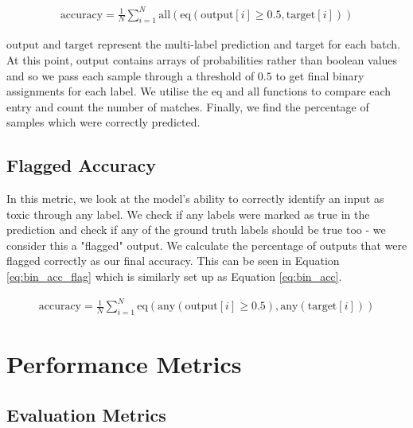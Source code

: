\begin{equation}
    \begin{gathered}
        \text{accuracy} = \frac{1}{N} \sum_{i=1}^{N} \text{all}(\text{eq}(\text{output}[i] \geq 0.5, \text{target}[i]))
    \end{gathered}
    \label{eq:bin_acc}
\end{equation}

$\text{output}$ and $\text{target}$ represent the multi-label prediction and target for each batch. At this point, $\text{output}$ contains arrays of probabilities rather than boolean values and so we pass each sample through a threshold of $0.5$ to get final binary assignments for each label. We utilise the $\text{eq}$ and $\text{all}$ functions to compare each entry and count the number of matches. Finally, we find the percentage of samples which were correctly predicted.

\subsection{Flagged Accuracy}
\label{flag_acc}

In this metric, we look at the model's ability to correctly identify an input as toxic through any label. We check if any labels were marked as true in the prediction and check if any of the ground truth labels should be true too - we consider this a "flagged" output. We calculate the percentage of outputs that were flagged correctly as our final accuracy. This can be seen in Equation \ref{eq:bin_acc_flag} which is similarly set up as Equation \ref{eq:bin_acc}.

\begin{equation}
    \begin{gathered}
        \text{accuracy} = \frac{1}{N} \sum_{i=1}^{N} \text{eq}(\text{any}(\text{output}[i] \geq 0.5), \text{any}(\text{target}[i]))
    \end{gathered}
    \label{eq:bin_acc_flag}
\end{equation}

\section{Performance Metrics}

\subsection{Evaluation Metrics}
\label{eval_metrics}

